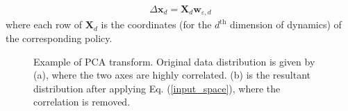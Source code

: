 \begin{equation}
\begin{gathered}
\Delta \bm{x}_{d} = 
\bm{X}_{d}
\bm{w}_{\varepsilon, d}
\end{gathered}
\label{prior_mean_function}
\end{equation}
where each row of $\bm{X}_{d}$ is the coordinates (for the $d^{\text{th}}$ dimension of dynamics) of the corresponding policy.
%
\begin{figure}[h]
\centering
{}
{}
\caption{Example of PCA transform. Original data distribution is given by (a), where the two axes are highly correlated. (b) is the resultant distribution after applying Eq. (\ref{input_space}), where the correlation is removed.}
\label{PCA_outcome}
\end{figure}



